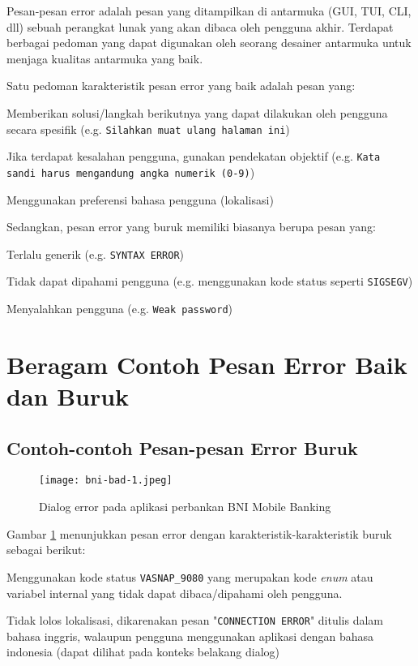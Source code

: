 \maketitle

Pesan-pesan error adalah pesan yang ditampilkan di antarmuka (GUI,
TUI, CLI, dll) sebuah perangkat lunak yang akan dibaca oleh pengguna
akhir. Terdapat berbagai pedoman yang dapat digunakan oleh seorang
desainer antarmuka untuk menjaga kualitas antarmuka yang baik.

Satu pedoman karakteristik pesan error yang baik adalah pesan yang:
\begin{pros}
\item Memberikan solusi/langkah berikutnya yang dapat dilakukan oleh
  pengguna secara spesifik (e.g. \texttt{Silahkan muat ulang halaman ini})
\item Jika terdapat kesalahan pengguna, gunakan pendekatan objektif
  (e.g. \texttt{Kata sandi harus mengandung angka numerik (0-9)})
\item Menggunakan preferensi bahasa pengguna (lokalisasi)
\end{pros}
Sedangkan, pesan error yang buruk memiliki biasanya berupa pesan yang:
\begin{cons}
\item Terlalu generik (e.g. \texttt{SYNTAX ERROR})
\item Tidak dapat dipahami pengguna (e.g. menggunakan kode status
  seperti \texttt{SIGSEGV})
\item Menyalahkan pengguna (e.g. \texttt{Weak password})
\end{cons}

\section{Beragam Contoh Pesan Error Baik dan Buruk}
\subsection{Contoh-contoh Pesan-pesan Error Buruk}

\begin{figure}[H]
  \centering
  \texttt{[image: bni-bad-1.jpeg]}
  \caption{Dialog error pada aplikasi perbankan BNI Mobile Banking}
  \label{fig:bad-err1}
\end{figure}
Gambar \ref{fig:bad-err1} menunjukkan pesan error dengan
karakteristik-karakteristik buruk sebagai berikut:
\begin{cons}
\item Menggunakan kode status \texttt{VASNAP\_9080} yang merupakan kode
  \textit{enum} atau variabel internal yang tidak dapat
  dibaca/dipahami oleh pengguna.
\item Tidak lolos lokalisasi, dikarenakan pesan "\texttt{CONNECTION
  ERROR}" ditulis dalam bahasa inggris, walaupun pengguna menggunakan
  aplikasi dengan bahasa indonesia (dapat dilihat pada konteks belakang dialog)
\end{cons}

